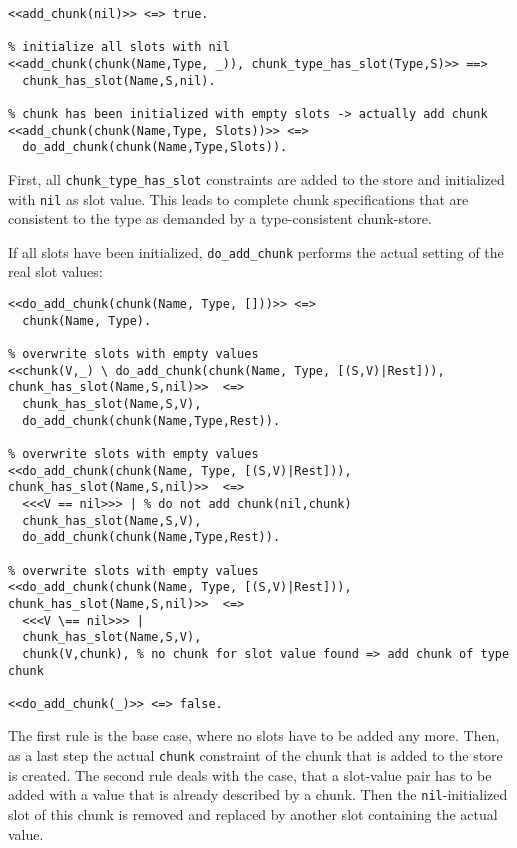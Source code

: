 \begin{lstlisting}[caption={Rules for \texttt{add\_chunk}}, label=lst:add_chunk_rules]
% empty chunk will not be added
<<add_chunk(nil)>> <=> true.
  
% initialize all slots with nil
<<add_chunk(chunk(Name,Type, _)), chunk_type_has_slot(Type,S)>> ==> 
  chunk_has_slot(Name,S,nil).

% chunk has been initialized with empty slots -> actually add chunk
<<add_chunk(chunk(Name,Type, Slots))>> <=>
  do_add_chunk(chunk(Name,Type,Slots)).
\end{lstlisting}

First, all \lstinline|chunk_type_has_slot| constraints are added to the store and initialized with \lstinline|nil| as slot value. This leads to complete chunk specifications that are consistent to the type as demanded by a type-consistent chunk-store.

If all slots have been initialized, \lstinline|do_add_chunk| performs the actual setting of the real slot values:
  
\begin{lstlisting}[caption={Additional rules for adding chunks}]  
% base case
<<do_add_chunk(chunk(Name, Type, []))>> <=> 
  chunk(Name, Type). 

% overwrite slots with empty values
<<chunk(V,_) \ do_add_chunk(chunk(Name, Type, [(S,V)|Rest])), chunk_has_slot(Name,S,nil)>>  <=>
  chunk_has_slot(Name,S,V), 
  do_add_chunk(chunk(Name,Type,Rest)).

% overwrite slots with empty values  
<<do_add_chunk(chunk(Name, Type, [(S,V)|Rest])), chunk_has_slot(Name,S,nil)>>  <=> 
  <<<V == nil>>> | % do not add chunk(nil,chunk)
  chunk_has_slot(Name,S,V), 
  do_add_chunk(chunk(Name,Type,Rest)).  

% overwrite slots with empty values  
<<do_add_chunk(chunk(Name, Type, [(S,V)|Rest])), chunk_has_slot(Name,S,nil)>>  <=> 
  <<<V \== nil>>> |
  chunk_has_slot(Name,S,V), 
  chunk(V,chunk), % no chunk for slot value found => add chunk of type chunk 
  
<<do_add_chunk(_)>> <=> false.
\end{lstlisting}

The first rule is the base case, where no slots have to be added any more. Then, as a last step the actual \lstinline|chunk| constraint of the chunk that is added to the store is created. The second rule deals with the case, that a slot-value pair has to be added with a value that is already described by a chunk. Then the \lstinline|nil|-initialized slot of this chunk is removed and replaced by another slot containing the actual value. 

